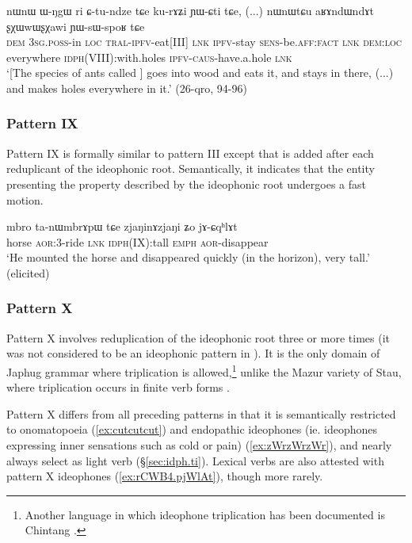 \begin{exe} 
\ex \label{ex:sxXwwWsxWawi}
\gll nɯnɯ ɯ-ŋgɯ ri ɕ-tu-ndze tɕe ku-rɤʑi ɲɯ-ɕti tɕe, (...) nɯnɯtɕu aʁɤndɯndɤt ʂχɯwɯʂχawi ɲɯ-sɯ-spoʁ tɕe \\
\textsc{dem} \textsc{3sg}.\textsc{poss}-in \textsc{loc} \textsc{tral}-\textsc{ipfv}-eat[III] \textsc{lnk} \textsc{ipfv}-stay \textsc{sens}-be.\textsc{aff}:\textsc{fact} \textsc{lnk} {  } \textsc{dem}:\textsc{loc} everywhere \textsc{idph}(VIII):with.holes \textsc{ipfv}-\textsc{caus}-have.a.hole \textsc{lnk} \\
\glt `[The species of ants called ] goes into wood and eats it, and stays in there, (...) and makes holes everywhere in it.' (26-qro, 94-96)
\end{exe} 

\subsubsection{Pattern IX} \label{sec:ideo.IX}
Pattern IX is formally similar to pattern III except that  is added after each reduplicant of the ideophonic root. Semantically, it indicates that the entity presenting the property described by the ideophonic root undergoes a fast motion.

\begin{exe} 
\ex  \label{ex:ideo9}
\gll  mbro ta-nɯmbrɤpɯ tɕe zjaŋinɤzjaŋi ʑo jɤ-ɕqʰlɤt   \\
horse \textsc{aor}:3\flobv{}-ride \textsc{lnk} \textsc{idph}(IX):tall \textsc{emph} \textsc{aor}-disappear \\
\glt `He mounted the horse and disappeared quickly (in the horizon), very tall.'  (elicited)
 \end{exe}

 
\subsubsection{Pattern X} \label{sec:ideo.X}
Pattern X involves reduplication of the ideophonic root three or more times (it was not considered to be an ideophonic pattern in \citealt{japhug14ideophones}). It is the only domain of Japhug grammar where triplication is allowed,\footnote{Another language in which ideophone triplication has been documented is Chintang \citep{rai06triplication}.
} unlike the Mazur variety of Stau, where triplication occurs in finite verb forms \citep{gates17triplication}.

Pattern X differs from all preceding patterns in that it is semantically restricted to onomatopoeia (\ref{ex:cutcutcut}) and endopathic ideophones (ie. ideophones expressing inner sensations such as cold or pain) (\ref{ex:zWrzWrzWr}), and nearly always select  as light verb (§\ref{sec:idph.ti}). Lexical verbs are also attested with pattern X ideophones (\ref{ex:rCWB4.pjWlAt}), though more rarely.
 
